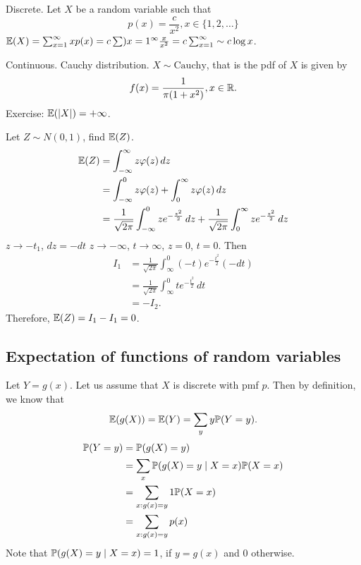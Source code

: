 \documentclass[10pt, a4paper]{article}
\begin{document}
\begin{example}
    Discrete.
    Let $X$ be a random variable such that
    \[
    p(x) = \frac{c}{x ^ 2}, x \in \{1, 2, \dotsc\}
    \]
    $\E(X) = \sum_{x = 1}^{\infty}xp(x) = c\sum){x = 1}^{\infty} \frac{x}{x ^ 2} = c\sum_{x = 1}^{\infty} \sim c\log x$.

    Continuous.
    Cauchy distribution.
    $X \sim \mathrm{Cauchy}$,
    that is the pdf of $X$ is given by
    \[
    f(x) = \frac{1}{\pi(1 + x ^ 2)}, x \in \R.
    \]
    Exercise: $\E(|X|) = +\infty$.

    Let $Z \sim N(0, 1)$, find $\E(Z)$.
    \begin{align*}
    \E(Z) &= \int_{-\infty}^{\infty}z\varphi(z)\,dz \\
    &= \int_{-\infty}^{0}z\varphi(z) + \int_{0}^{\infty}z\varphi(z)\,dz \\
    &= \frac{1}{\sqrt{2\pi}}\int_{-\infty}^{0}ze ^ {-\frac{z ^ 2}{2}}\,dz + \frac{1}{\sqrt{2\pi}}\int_{0}^{\infty}ze ^ {-\frac{z ^ 2}{2}}\,dz \\
    \end{align*}
    $z \rightarrow -t_1$, $dz = -dt$ $z \rightarrow -\infty$, $t \rightarrow \infty$, $z = 0$, $t = 0$.
    Then
    \begin{align*}
        I_1 &= \frac{1}{\sqrt{2\pi}}\int_{\infty}^{0}(-t)e ^ {-\frac{t ^ 2}{2}}(-dt) \\
        &= \frac{1}{\sqrt{2\pi}}\int_{\infty}^{0}te ^ {-\frac{t ^ 2}{2}}\,dt \\
        &= -I_2.
    \end{align*}
    Therefore,
    $\E(Z) = I_1 - I_1 = 0$.
\end{example}

\subsection{Expectation of functions of random variables}
Let $Y = g(x)$.
Let us assume that $X$ is discrete with pmf $p$.
Then by definition,
we know that
\[
\E(g(X)) = \E(Y) = \sum_{y}y\P(Y = y).
\]
\begin{align*}
    \P(Y = y) &= \P(g(X) = y) \\
    &= \sum_{x}\P(g(X) = y\mid X = x)\P(X = x) \\
    &= \sum_{x : g(x) = y}1\P(X = x) \\
    &= \sum_{x : g(x) = y}p(x)
\end{align*}
Note that $\P(g(X) = y\mid X = x) = 1$,
if $y = g(x)$ and $0$ otherwise.
\end{document}
